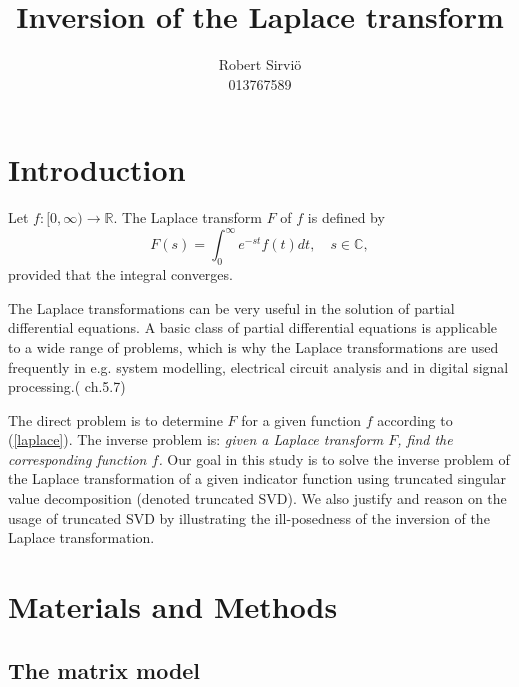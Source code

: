 \documentclass[12pt,a4]{article}
\title{Inversion of the Laplace transform}
\author{Robert Sirviö\\013767589}
\newcommand{\R}{{\mathbb R}}
\newcommand{\C}{{\mathbb C}}
\begin{document}
\maketitle

\section{Introduction}

Let $f:[0,\infty)\rightarrow \R$. The Laplace transform $F$ of $f$ is defined by
\begin{equation}\label{laplace}
 F(s) = \int_0^\infty e^{-st}f(t)dt,\quad s\in\C ,
\end{equation}
provided that the integral converges.     
\newline


The Laplace transformations can be very useful in the solution of partial differential equations. A basic class of partial differential equations is applicable to a wide range of problems, which is why the Laplace transformations are used frequently in e.g. system modelling, electrical circuit analysis and in digital signal processing.(\cite{transforms} ch.5.7)
\newline 

The direct problem is to determine $F$ for a given function $f$ according to (\ref{laplace}). The inverse problem is: {\em given a Laplace transform $F$, find the corresponding function $f$.} Our goal in this study is to solve the inverse problem of the Laplace transformation of a given indicator function using truncated singular value decomposition (denoted truncated SVD). We also justify and reason on the usage of truncated SVD by illustrating the ill-posedness of the inversion of the Laplace transformation.



\section{Materials and Methods}\label{sec:methods}

\subsection{The matrix model}\label{matrixModel}
\end{document}
